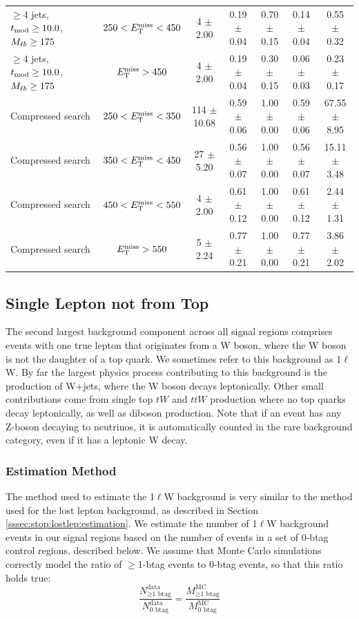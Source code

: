 \begin{table}
\begin{tabular}{|l|c|c|c|c|c|c|}
\hline
 $\ge4$ jets,~$t_\text{mod} \ge10.0$,~$M_{\ell b} \ge175$ & $250<E_\text{T}^\text{miss}<450$  & 4 $\pm$ 2.00  & 0.19 $\pm$ 0.04  & 0.70 $\pm$ 0.15 & 0.14 $\pm$ 0.04  & 0.55 $\pm$ 0.32  \\
 $\ge4$ jets,~$t_\text{mod} \ge10.0$,~$M_{\ell b} \ge175$ & $E_\text{T}^\text{miss}>450$  & 4 $\pm$ 2.00  & 0.19 $\pm$ 0.04  & 0.30 $\pm$ 0.15 & 0.06 $\pm$ 0.03  & 0.23 $\pm$ 0.17  \\
\hline
Compressed search & $250<E_\text{T}^\text{miss}<350$  & 114 $\pm$ 10.68  & 0.59 $\pm$ 0.06 & 1.00 $\pm$ 0.00 & 0.59 $\pm$ 0.06  & 67.55 $\pm$ 8.95  \\
Compressed search & $350<E_\text{T}^\text{miss}<450$  &  27 $\pm$ 5.20   & 0.56 $\pm$ 0.07 & 1.00 $\pm$ 0.00 & 0.56 $\pm$ 0.07  & 15.11 $\pm$ 3.48  \\
Compressed search & $450<E_\text{T}^\text{miss}<550$  &   4 $\pm$ 2.00   & 0.61 $\pm$ 0.12 & 1.00 $\pm$ 0.00 & 0.61 $\pm$ 0.12  &  2.44 $\pm$ 1.31  \\
Compressed search & $E_\text{T}^\text{miss}>550$      &   5 $\pm$ 2.24   & 0.77 $\pm$ 0.21 & 1.00 $\pm$ 0.00 & 0.77 $\pm$ 0.21  &  3.86 $\pm$ 2.02  \\
\hline
\end{tabular}
\end{table}

\subsection{Single Lepton not from Top}
\label{ssec:stop:1lw}

The second largest background component across all signal regions
comprises events with one true lepton that originates from a W boson,
where the W boson is not the daughter of a top quark. We sometimes refer to
this background as 1$\ell$W. By far the
largest physics process contributing to this background is the
production of W+jets, where the W boson decays leptonically. Other
small contributions come from single top $tW$ and $ttW$
production where no top quarks decay leptonically, as well as diboson
production. Note that if an event has any Z-boson decaying to
neutrinos, it is automatically counted in the rare background
category, even if it has a leptonic W decay.

\subsubsection{Estimation Method}
\label{sssec:stop:1lw:estimation}

The method used to estimate the 1$\ell$W background is very similar to
the method used for the lost lepton background, as described in
Section \ref{sssec:stop:lostlep:estimation}. We estimate the number of
1$\ell$W background events in our signal regions based on the number of events in a
set of 0-btag control regions, described below. We assume that Monte
Carlo simulations correctly model the ratio of $\geq$1-btag events to
0-btag events, so that this ratio holds true:
\begin{equation}
\label{eq:stop:1lw:rationm}
\frac{N_{\geq\text{1 btag}}^\text{data}}{N_\text{0 btag}^\text{data}} = \frac{M_{\geq\text{1 btag}}^\text{MC}}{M_\text{0 btag}^\text{MC}}
\end{equation}

